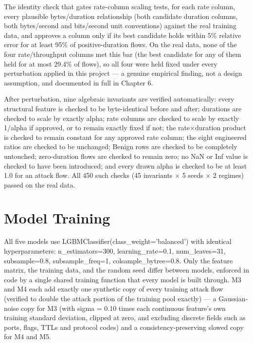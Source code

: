 \documentclass[12pt,a4paper]{report}
\begin{document}
The identity check that gates rate-column scaling tests, for each rate column, every plausible bytes/duration relationship (both candidate duration columns, both bytes/second and bits/second unit conventions) against the real training data, and approves a column only if its best candidate holds within 5\% relative error for at least 95\% of positive-duration flows. On the real data, none of the four rate/throughput columns met this bar (the best candidate for any of them held for at most 29.4\% of flows), so all four were held fixed under every perturbation applied in this project --- a genuine empirical finding, not a design assumption, and documented in full in Chapter 6.

After perturbation, nine algebraic invariants are verified automatically: every structural feature is checked to be byte-identical before and after; durations are checked to scale by exactly alpha; rate columns are checked to scale by exactly 1/alpha if approved, or to remain exactly fixed if not; the rate$\times$duration product is checked to remain constant for any approved rate column; the eight engineered ratios are checked to be unchanged; Benign rows are checked to be completely untouched; zero-duration flows are checked to remain zero; no NaN or Inf value is checked to have been introduced; and every drawn alpha is checked to be at least 1.0 for an attack flow. All 450 such checks (45 invariants $\times$ 5 seeds $\times$ 2 regimes) passed on the real data.

\section{Model Training}
All five models use LGBMClassifier(class\_weight='balanced') with identical hyperparameters: n\_estimators=300, learning\_rate=0.1, num\_leaves=31, subsample=0.8, subsample\_freq=1, colsample\_bytree=0.8. Only the feature matrix, the training data, and the random seed differ between models, enforced in code by a single shared training function that every model is built through. M3 and M4 each add exactly one synthetic copy of every training attack flow (verified to double the attack portion of the training pool exactly) --- a Gaussian-noise copy for M3 (with sigma = 0.10 times each continuous feature's own training standard deviation, clipped at zero, and excluding discrete fields such as ports, flags, TTLs and protocol codes) and a consistency-preserving slowed copy for M4 and M5.
\end{document}

